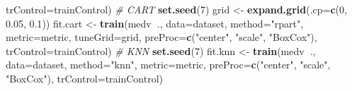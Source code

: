 \documentclass[]{book}
\newenvironment{Shaded}{\begin{snugshade}}{\end{snugshade}}
\newcommand{\CommentTok}[1]{\textcolor[rgb]{0.56,0.35,0.01}{\textit{#1}}}
\newcommand{\DataTypeTok}[1]{\textcolor[rgb]{0.13,0.29,0.53}{#1}}
\newcommand{\DecValTok}[1]{\textcolor[rgb]{0.00,0.00,0.81}{#1}}
\newcommand{\FloatTok}[1]{\textcolor[rgb]{0.00,0.00,0.81}{#1}}
\newcommand{\KeywordTok}[1]{\textcolor[rgb]{0.13,0.29,0.53}{\textbf{#1}}}
\newcommand{\NormalTok}[1]{#1}
\newcommand{\OperatorTok}[1]{\textcolor[rgb]{0.81,0.36,0.00}{\textbf{#1}}}
\newcommand{\StringTok}[1]{\textcolor[rgb]{0.31,0.60,0.02}{#1}}
\begin{document}
\begin{Shaded}
\begin{Highlighting}[]
                 \DataTypeTok{trControl=}\NormalTok{trainControl)}
\CommentTok{# CART}
\KeywordTok{set.seed}\NormalTok{(}\DecValTok{7}\NormalTok{)}
\NormalTok{grid <-}\StringTok{ }\KeywordTok{expand.grid}\NormalTok{(}\DataTypeTok{.cp=}\KeywordTok{c}\NormalTok{(}\DecValTok{0}\NormalTok{, }\FloatTok{0.05}\NormalTok{, }\FloatTok{0.1}\NormalTok{))}
\NormalTok{fit.cart <-}\StringTok{ }\KeywordTok{train}\NormalTok{(medv}\OperatorTok{~}\NormalTok{., }\DataTypeTok{data=}\NormalTok{dataset, }\DataTypeTok{method=}\StringTok{"rpart"}\NormalTok{, }\DataTypeTok{metric=}\NormalTok{metric,}
                  \DataTypeTok{tuneGrid=}\NormalTok{grid,}
                  \DataTypeTok{preProc=}\KeywordTok{c}\NormalTok{(}\StringTok{"center"}\NormalTok{, }\StringTok{"scale"}\NormalTok{, }\StringTok{"BoxCox"}\NormalTok{),}
                  \DataTypeTok{trControl=}\NormalTok{trainControl)}
\CommentTok{# KNN}
\KeywordTok{set.seed}\NormalTok{(}\DecValTok{7}\NormalTok{)}
\NormalTok{fit.knn <-}\StringTok{ }\KeywordTok{train}\NormalTok{(medv}\OperatorTok{~}\NormalTok{., }\DataTypeTok{data=}\NormalTok{dataset, }\DataTypeTok{method=}\StringTok{"knn"}\NormalTok{, }\DataTypeTok{metric=}\NormalTok{metric, }
                 \DataTypeTok{preProc=}\KeywordTok{c}\NormalTok{(}\StringTok{"center"}\NormalTok{, }\StringTok{"scale"}\NormalTok{, }\StringTok{"BoxCox"}\NormalTok{), }
                 \DataTypeTok{trControl=}\NormalTok{trainControl)}


\end{Highlighting}
\end{Shaded}
\end{document}
